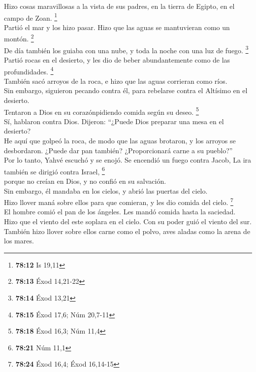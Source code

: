  Hizo cosas maravillosas a la vista de sus padres, en la
tierra de Egipto, en el campo de Zoan. \footnote{\textbf{78:12} Is 19,11}\\
 Partió el mar y los hizo pasar. Hizo que las aguas se
mantuvieran como un montón. \footnote{\textbf{78:13} Éxod 14,21-22}\\
 De día también los guiaba con una nube, y toda la noche
con una luz de fuego. \footnote{\textbf{78:14} Éxod 13,21}\\
 Partió rocas en el desierto, y les dio de beber
abundantemente como de las profundidades. \footnote{\textbf{78:15} Éxod
  17,6; Núm 20,7-11}\\
 También sacó arroyos de la roca, e hizo que las aguas
corrieran como ríos.\\
 Sin embargo, siguieron pecando contra él, para rebelarse
contra el Altísimo en el desierto.\\
 Tentaron a Dios en su corazónpidiendo comida según su
deseo. \footnote{\textbf{78:18} Éxod 16,3; Núm 11,4}\\
 Sí, hablaron contra Dios. Dijeron: ``¿Puede Dios
preparar una mesa en el desierto?\\
 He aquí que golpeó la roca, de modo que las aguas
brotaron, y los arroyos se desbordaron. ¿Puede dar pan también?
¿Proporcionará carne a su pueblo?''\\
 Por lo tanto, Yahvé escuchó y se enojó. Se encendió un
fuego contra Jacob, La ira también se dirigió contra Israel,
\footnote{\textbf{78:21} Núm 11,1}\\
 porque no creían en Dios, y no confió en su salvación.\\
 Sin embargo, él mandaba en los cielos, y abrió las
puertas del cielo.\\
 Hizo llover maná sobre ellos para que comieran, y les
dio comida del cielo. \footnote{\textbf{78:24} Éxod 16,4; Éxod 16,14-15}\\
 El hombre comió el pan de los ángeles. Les mandó comida
hasta la saciedad.\\
 Hizo que el viento del este soplara en el cielo. Con su
poder guió el viento del sur.\\
 También hizo llover sobre ellos carne como el polvo,
aves aladas como la arena de los mares.\\
